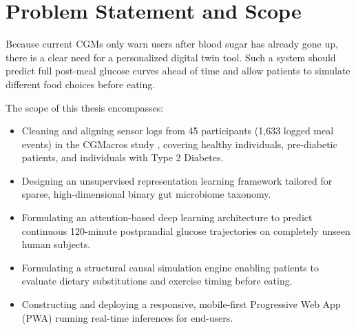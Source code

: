 \section{Problem Statement and Scope}
Because current CGMs only warn users after blood sugar has already gone up, there is a clear need for a personalized digital twin tool. Such a system should predict full post-meal glucose curves ahead of time and allow patients to simulate different food choices before eating.

The scope of this thesis encompasses:
\begin{itemize}
    \item Cleaning and aligning sensor logs from 45 participants (1,633 logged meal events) in the CGMacros study \cite{mendes2024cgmacros}, covering healthy individuals, pre-diabetic patients, and individuals with Type 2 Diabetes.
    \item Designing an unsupervised representation learning framework tailored for sparse, high-dimensional binary gut microbiome taxonomy.
    \item Formulating an attention-based deep learning architecture to predict continuous 120-minute postprandial glucose trajectories on completely unseen human subjects.
    \item Formulating a structural causal simulation engine enabling patients to evaluate dietary substitutions and exercise timing before eating.
    \item Constructing and deploying a responsive, mobile-first Progressive Web App (PWA) running real-time inferences for end-users.
\end{itemize}

